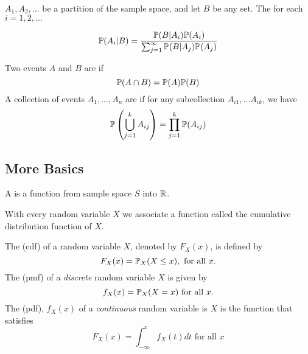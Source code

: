 \begin{theorem}

$A_1, A_2,...$ be a partition of the sample space, and let $B$ be any set. The for each $i = 1,2,...$

$$
\mathbb P(A_i|B) = \frac{\mathbb P(B|A_i)\mathbb P(A_i)}{\sum_{j=1}^{\infty}\mathbb P(B|A_j)\mathbb P(A_j)}
$$
\end{theorem}

\begin{definition}
    Two events $A$ and $B$ are  if
    $$
    \mathbb P(A \cap B) = \mathbb P(A)\mathbb P(B)
    $$
    A collection of events $A_1,...,A_n$ are  if for any subcollection $A_{i1},...A_{ik}$, we have 
    $$
    \mathbb P\left( \bigcup_{j=1}^{k}A_{ij} \right ) = \prod_{j=1}^{k} \mathbb P(A_{ij})
    $$
\end{definition}
\subsection{More Basics}
\begin{definition}
    A  is a function from sample space $S$ into $\mathbb R$.
\end{definition}
With every random variable $X$ we associate a function called the cumulative distribution function of $X$.
\begin{definition}
    The  (cdf) of a random variable $X$, denoted by $F_{X}(x)$, is defined by 
    $$
    F_X(x) = \mathbb P_X(X\leq x), \text{ for all } x.
    $$
    The  (pmf) of a \textit{discrete} random variable $X$ is given by
    $$
    f_X(x) = \mathbb P_X(X=x) \text{ for all } x.
    $$
    The  (pdf), $f_X(x)$ of a \textit{continuous} random variable is $X$ is the function that satisfies
    $$
    F_X(x) = \int_{-\infty}^{x}f_X(t)dt \text{ for all } x
    $$
    
    
\end{definition}
